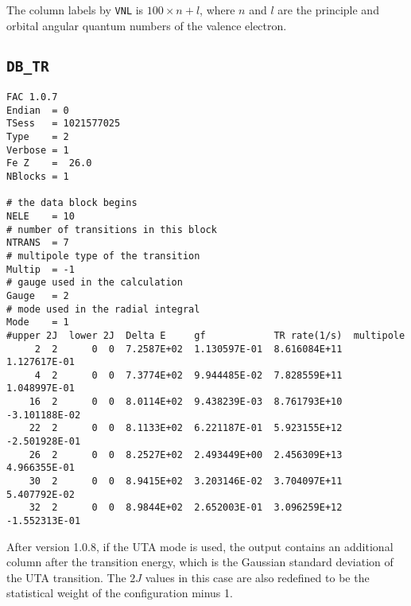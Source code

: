The column labels by \verb|VNL| is $100\times n + l$, where $n$ and $l$ 
are the principle and orbital angular quantum numbers of the valence 
electron.

\subsection{\texttt{DB\_TR}}
\begin{verbatim}
FAC 1.0.7
Endian	= 0
TSess	= 1021577025
Type	= 2
Verbose	= 1
Fe Z	=  26.0
NBlocks	= 1

# the data block begins
NELE	= 10
# number of transitions in this block
NTRANS	= 7
# multipole type of the transition
Multip	= -1
# gauge used in the calculation
Gauge	= 2
# mode used in the radial integral
Mode	= 1
#upper 2J  lower 2J  Delta E     gf            TR rate(1/s)  multipole
     2  2      0  0  7.2587E+02  1.130597E-01  8.616084E+11  1.127617E-01
     4  2      0  0  7.3774E+02  9.944485E-02  7.828559E+11  1.048997E-01
    16  2      0  0  8.0114E+02  9.438239E-03  8.761793E+10 -3.101188E-02
    22  2      0  0  8.1133E+02  6.221187E-01  5.923155E+12 -2.501928E-01
    26  2      0  0  8.2527E+02  2.493449E+00  2.456309E+13  4.966355E-01
    30  2      0  0  8.9415E+02  3.203146E-02  3.704097E+11  5.407792E-02
    32  2      0  0  8.9844E+02  2.652003E-01  3.096259E+12 -1.552313E-01
\end{verbatim}

After version 1.0.8, if the UTA mode is used, the output contains an
additional column after the transition energy, which is the Gaussian standard
deviation of the UTA transition. The $2J$ values in this case are also
redefined to be the statistical weight of the configuration minus 1.


